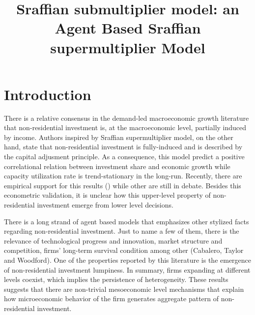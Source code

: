 \documentclass{SelfArx}
\date{}
\title{Sraffian submultiplier model: an Agent Based Sraffian supermultiplier Model}
\begin{document}


\newcommand{\keywordname}{Keywords} %


\flushbottom %
\maketitle %
\thispagestyle{empty} %

\section{Introduction}
\label{sec:orgeab491b}
There is a relative consensus in the demand-led macroeconomic growth literature that non-residential investment is, at the macroeconomic level, partially induced by income.
Authors inspired by Sraffian supermultiplier model, on the other hand, state that non-residential investment is fully-induced and is described by the capital adjusment principle.
As a consequence, this model predict a positive correlational relation between investment share and economic growth while capacity utilization rate is trend-stationary in the long-run.
Recently, there are empirical support for this results () while other are still in debate.
Besides this econometric validation, it is unclear how this upper-level property of non-residential investment emerge from lower level decisions.

There is a long strand of agent based models that emphasizes other stylized facts regarding non-residential investment.
Just to name a few of them, there is the relevance of technological progress and innovation, market structure and competition, firms' long-term survival condition among other (Cabalero, Taylor and Woodford).
One of the properties reported by this literature is the emergence of non-residential investment lumpiness.
In summary, firms expanding at different levels coexist, which implies the persistence of heterogeneity.
These results suggests that there are non-trivial mesoeconomic level mechanisms that explain how microeconomic behavior of the firm generates aggregate pattern of non-residential investment.
\end{document}
